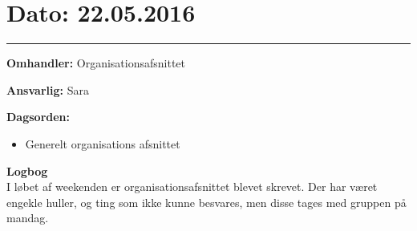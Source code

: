 \section{Dato: 22.05.2016}
\hrule

\textbf{Omhandler:} Organisationsafsnittet

\textbf{Ansvarlig:} Sara

\textbf{Dagsorden:}
\begin{itemize}
	\item Generelt organisations afsnittet
\end{itemize}

\textbf{Logbog}
\\
I løbet af weekenden er organisationsafsnittet blevet skrevet. Der har været engekle huller, og ting som ikke kunne besvares, men disse tages med gruppen på mandag. 



